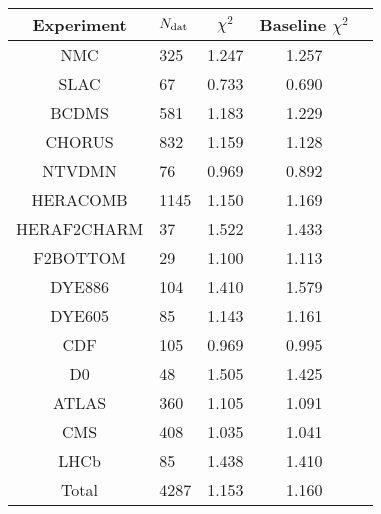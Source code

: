 \begin{center}
    \renewcommand*{\arraystretch}{1.50}
    \small
  \begin{tabular}{|c|l|c|c|c|}
  \toprule
  Experiment    & $N_{\rm dat}$ & $\chi^2$    & Baseline $\chi^2$     \\
  \midrule
  NMC   & 325 & 1.247   & 1.257     \\
  SLAC  & 67  & 0.733  & 0.690    \\
  BCDMS & 581 & 1.183   & 1.229 \\
  CHORUS & 832 & 1.159  & 1.128 \\
  NTVDMN & 76   & 0.969 & 0.892 \\
  HERACOMB & 1145 & 1.150 & 1.169 \\
  HERAF2CHARM & 37 & 1.522 & 1.433 \\
  F2BOTTOM & 29 & 1.100 & 1.113 \\ 
  DYE886 & 104 & 1.410 & 1.579 \\
  DYE605 & 85 & 1.143 & 1.161 \\ 
  CDF & 105 & 0.969 & 0.995 \\
  D0 & 48 & 1.505 & 1.425 \\
  ATLAS & 360 & 1.105 & 1.091 \\
  CMS & 408 & 1.035 & 1.041 \\
  LHCb & 85 & 1.438 & 1.410 \\
  \bottomrule
  Total & 4287 & 1.153 & 1.160 \\
  \bottomrule
  \end{tabular}
  \end{center}
  